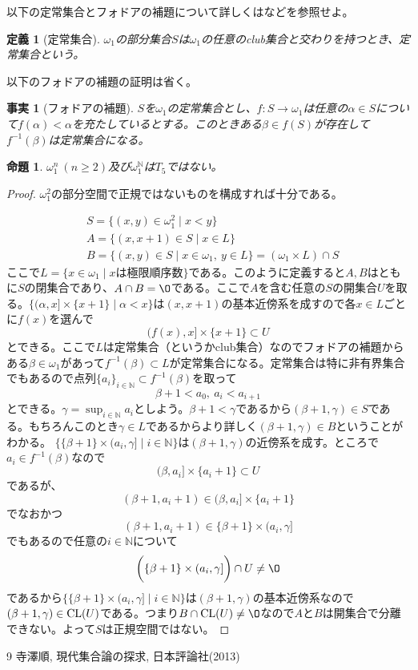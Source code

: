 \documentclass[leqno]{jsarticle}
\newtheorem{prop}[thm]{命題}
\newtheorem{df}[thm]{定義}
\newtheorem{fact}[thm]{事実}
\newcommand{\nn}{\mathbb{N}}
\newcommand{\al}{\alpha}
\newcommand{\be}{\beta}
\newcommand{\ga}{\gamma}
\newcommand{\cl}{\text{{\rm CL}}}
\begin{document}
以下の定常集合とフォドアの補題について詳しくは\cite{1}などを参照せよ。

\begin{df}[定常集合]
$\omega_1$の部分集合$S$は$\omega_1$の任意のclub集合と交わりを持つとき、定常集合という。
\end{df}

以下のフォドアの補題の証明は省く。
\begin{fact}[フォドアの補題]
$S$を$\omega_1$の定常集合とし、$f\colon S\to \omega_1$は任意の$\al\in S$について$f(\al)<\al$を充たしているとする。このときある$\be\in f(S)$が存在して$f^{-1}(\be)$は定常集合になる。
\end{fact}


\begin{prop}
$\omega_1^n\ (n\ge2)$及び$\omega_1^{\nn}$は$T_5$ではない。
\end{prop}
\begin{proof}
$\omega_1^2$の部分空間で正規ではないものを構成すれば十分である。\par

\begin{align*}
&S=\{(x,y)\in \omega_1^2\mid x<y\}\\
&A=\{(x,x+1)\in S\mid x\in L\}\\
&B=\{(x,y)\in S\mid x\in \omega_1,\ y\in L\}=(\omega_1\times L)\cap S
\end{align*}
ここで$L=\{x\in \omega_1\mid \text{$x$は極限順序数}\}$である。このように定義すると$A,B$はともに$S$の閉集合であり、$A\cap B=\O$である。ここで$A$を含む任意の$S$の開集合$U$を取る。$\bigl\{(\al,x]\times \{x+1\}\mid \al<x\bigr\}$は$(x,x+1)$の基本近傍系を成すので各$x\in L$ごとに$f(x)$を選んで
\[
(f(x),x]\times \{x+1\}\subset U
\]
とできる。ここで$L$は定常集合（というかclub集合）なのでフォドアの補題からある$\be\in \omega_1$があって$f^{-1}(\be)\subset L$が定常集合になる。定常集合は特に非有界集合でもあるので点列$\{a_i\}_{i\in \nn}\subset f^{-1}(\be)$を取って
\[
\be+1<a_0,\ a_i<a_{i+1}
\]
とできる。$\gamma=\sup_{i\in \nn}a_i$としよう。$\be+1<\ga$であるから$(\be+1,\ga)\in S$である。もちろんこのとき$\gamma\in L$であるからより詳しく$(\be+1,\gamma)\in B$ということがわかる。
$\bigl\{\{\be+1\}\times (a_i,\gamma]\mid i\in \nn\bigr\}$は$(\be+1,\gamma)$の近傍系を成す。ところで$a_i\in f^{-1}(\be)$なので
\[
(\be,a_i]\times \{a_i+1\}\subset U
\]
であるが、
\[
(\be+1,a_i+1)\in(\be,a_i]\times \{a_i+1\}
\]
でなおかつ
\[
(\be+1,a_i+1)\in \{\be+1\}\times (a_i,\gamma]
\]
でもあるので任意の$i\in \nn$について
\[
\biggl(\{\be+1\}\times (a_i,\gamma]\biggr)\cap U\neq\O
\]
であるから$\bigl\{\{\be+1\}\times (a_i,\gamma]\mid i\in \nn\bigr\}$は$(\be+1,\gamma)$の基本近傍系なので$(\be+1,\gamma)\in \cl(U)$である。つまり$B\cap \cl(U)\neq \O$なので$A$と$B$は開集合で分離できない。よって$S$は正規空間ではない。
\end{proof}






	
\begin{thebibliography}{9}
寺澤順, 現代集合論の探求, 日本評論社(2013)
\end{thebibliography}




			
\end{document}
